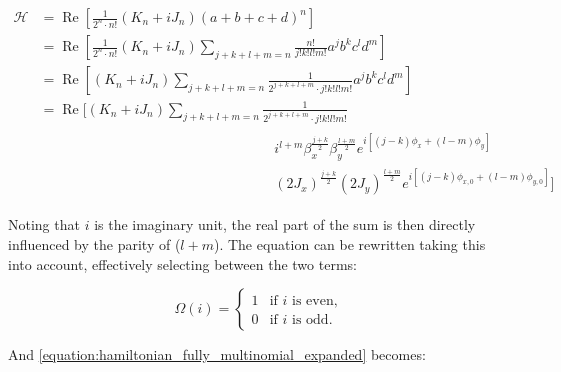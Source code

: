 \begin{equation}
    \begin{aligned}
        \mathcal{H} &=  \operatorname{Re} \left[ \frac{1}{2^n \cdot n!} (K_n + i J_n) (a + b + c + d)^n \right] \\
                    &=  \operatorname{Re} \left[ \frac{1}{2^n \cdot n!} (K_n + i J_n) \sum_{j + k + l + m = n} \frac{n!}{j! k! l! m!} a^j b^k c^l d^m \right] \\
                    &=  \operatorname{Re} \left[ (K_n + i J_n)  \sum_{j + k + l + m = n} \frac{1}{2^{j+k+l+m} \cdot j! k! l! m!} a^j b^k c^l d^m \right] \\
                    &=  \operatorname{Re} 
                    \biggl[ 
                        (K_n + i J_n) \sum_{j + k + l + m = n} \frac{1}{2^{j+k+l+m} \cdot j! k! l! m!} \\
                        & \begin{aligned} \phantom{ \operatorname{Re} \biggl[ (K_n + i J_n)  \sum_{j + k + l + m = n} \quad}
                        & i^{l+m} \beta_{x}^{\frac{j+k}{2}} \beta_{y}^{\frac{l+m}{2}} e^{i \left[ (j-k) \phi_x + (l-m) \phi_y \right]} \\
                        & (2 J_x)^{\frac{j+k}{2}} (2J_y)^{\frac{l+m}{2}} e^{i \left[ (j-k) \phi_{x,0} + (l-m) \phi_{y,0} \right]}
                    \biggr]
        \end{aligned}
    \end{aligned}
    \label{equation:hamiltonian_fully_multinomial_expanded}
\end{equation}

Noting that \(i\) is the imaginary unit, the real part of the sum is then directly influenced by the parity of (\(l + m\)).
The equation can be rewritten taking this into account, effectively selecting between the two terms:

\begin{equation}
    \Omega(i) =
        \begin{cases} 
        1 & \mbox{if } i \mbox{ is even}, \\
        0 & \mbox{if } i \mbox{ is odd}.
        \end{cases}
\end{equation}

And \cref{equation:hamiltonian_fully_multinomial_expanded} becomes:

